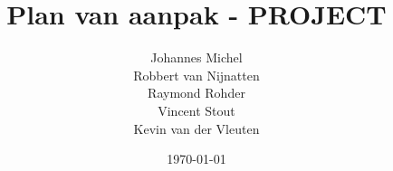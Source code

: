 

\newcommand{\projectname}{PROJECT}

\author{Johannes Michel\\Robbert van Nijnatten\\Raymond Rohder\\Vincent Stout\\Kevin van der Vleuten}
\title{Plan van aanpak - \projectname}
\date{\today}



\maketitle

\renewcommand*\contentsname{Inhoud}
\tableofcontents

%
















